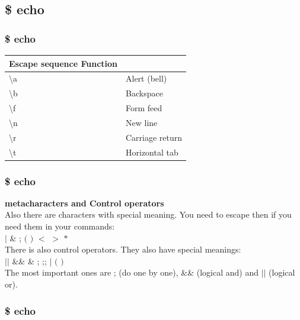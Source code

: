 \documentclass{beamer}
\begin{document}
\subsection{\$ echo}
\begin{frame}
\frametitle{\$ echo}
 \par
\vspace{0.15cm}
 \par
\vspace{0.15cm}
\begin{table}
\begin{tabular}{l l}
\toprule
\textbf{Escape sequence Function} & \textbf{}\\
\midrule
\textbackslash a & Alert (bell) \\
\textbackslash b & Backspace \\
\textbackslash f & Form feed \\
\textbackslash n & New line \\
\textbackslash r & Carriage return \\
\textbackslash t & Horizontal tab \\
\bottomrule
\end{tabular}
\end{table}
\end{frame}

\begin{frame}\frametitle{\$ echo}
{\bf metacharacters and Control operators}\\
Also there are characters with special meaning. You need to escape then if you need them in your commands:\\
$|$ \& ; $($ $)$ $<$ $>$ $*$ \\
There is also control operators. They also have special meanings:\\
$||$ \&\& \& ; ;; $|$ $($ $)$ \\
The most important ones are ; (do one by one), \&\& (logical and) and $||$ (logical or). 
\end{frame}

\begin{frame}\frametitle{\$ echo}
 \par
\vspace{0.15cm}
 \par
\vspace{0.15cm}
\end{frame}
\end{document}
